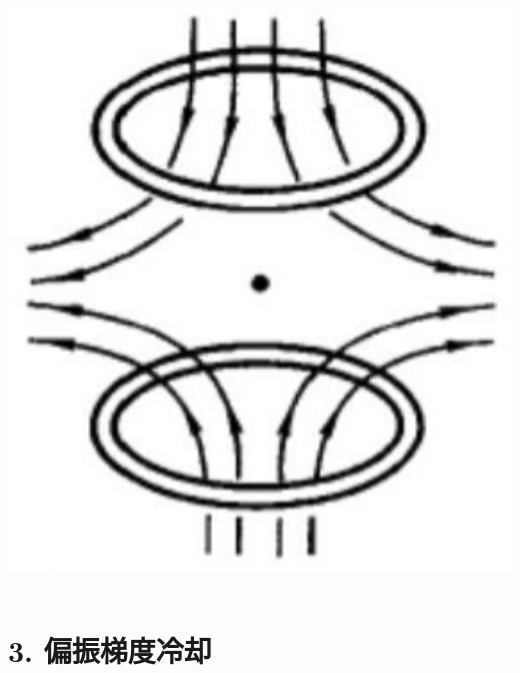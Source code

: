 \begin{frame}
\begin{columns}
\begin{column}[t]{0.230\linewidth}
\begin{center}
            \includegraphics[width=1.0\textwidth]{figs/2022-05-30-13-11-59.png}
       \end{center}
    \end{column}
\end{columns}   
\end{frame}

\section{3. 偏振梯度冷却}


